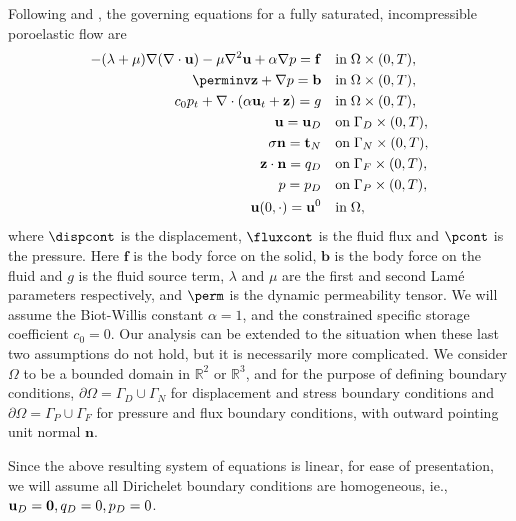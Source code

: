 Following \cite{phillips2007coupling} and \cite{showalter2000diffusion}, the governing equations for a fully saturated, incompressible poroelastic flow are
\begin{subequations}
\label{strong_cont_system}
\begin{align}
-(\lambda+\mu) \nabla (\nabla\cdot\mathbf{u}) - \mu \nabla^{2} \mathbf{u} + \alpha \nabla p = \mathbf{f} \quad &\mbox{in}\; \Omega\times (0,T),\\
\perminv \mathbf{z} + \nabla p =  \mathbf{b} \quad   &\mbox{in}\; \Omega\times (0,T), \\
c_0 p_t + \nabla \cdot (\alpha\mathbf{u}_{t} + \mathbf{z} )  = g \quad  &\mbox{in}\; \Omega\times (0,T), \\
\mathbf{u} = \mathbf{u}_{D} \quad & \mbox{on}\; \Gamma_{D}\times (0,T), \\
\mathbf{\sigma}\mathbf{n} = \mathbf{t}_{N} \quad  &\mbox{on}\; \Gamma_{N}\times (0,T), \\
\mathbf{z} \cdot \mathbf{n} = {q_{D}} \quad  &\mbox{on}\; \Gamma_{F}\times (0,T), \\
p = p_{D}  \quad  &\mbox{on}\; \Gamma_{P}\times (0,T), \\
\mathbf{u}(0,\cdot) = \mathbf{u}^{0}\quad  &\mbox{in}\;\Omega,
\end{align}
\end{subequations}
where $\dispcont$ is the displacement, $\fluxcont$ is the fluid flux and $\pcont$ is the pressure. Here $\mathbf{f}$ is the body force on the solid, $\mathbf{b}$ is the body force on the fluid and $g$ is the fluid source term, $\lambda$ and $\mu$ are the first and second Lam\'e parameters respectively, and $\perm$ is the dynamic permeability tensor. We will assume the Biot-Willis constant $\alpha=1$, and the constrained specific storage coefficient $c_0=0$. Our analysis can be extended to the situation when these last two assumptions do not hold, but it is necessarily more complicated. We consider $\Omega$ to be a bounded domain in $\mathbb{R}^{2}$ or $\mathbb{R}^{3}$, and for the purpose of defining boundary conditions, $\partial\Omega=\Gamma_D \cup \Gamma_N$ for displacement and stress boundary conditions and $\partial\Omega=\Gamma_P \cup \Gamma_F$ for pressure and flux boundary conditions, with outward pointing unit normal $\mathbf{n}$.

\begin{rem}
\label{remark:bdy}
Since the above resulting system of equations is linear, for ease of presentation,  we will assume all Dirichelet boundary conditions are homogeneous, ie., $\mathbf{u}_{D} = {\bf 0}, {q_{D}} = 0, p_{D}=0$.  %
\end{rem}



